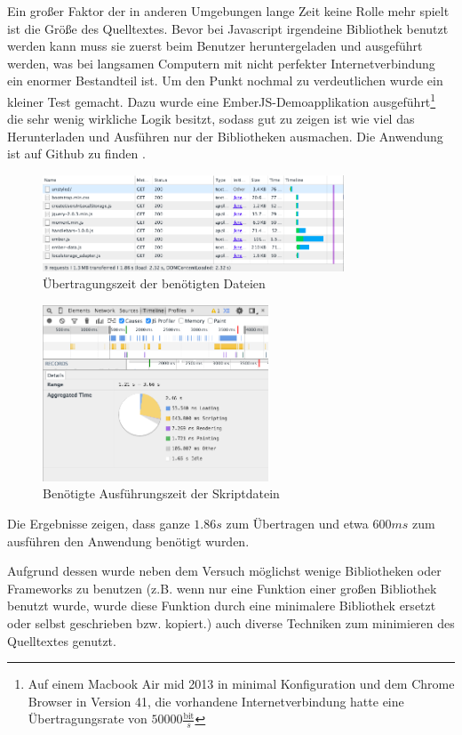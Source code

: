 \documentclass[12pt,twoside]{book}
\begin{document}
Ein großer Faktor der in anderen Umgebungen lange Zeit keine Rolle mehr spielt ist die Größe des Quelltextes. Bevor bei Javascript irgendeine Bibliothek benutzt werden kann muss sie zuerst beim Benutzer heruntergeladen und ausgeführt werden, was bei langsamen Computern mit nicht perfekter Internetverbindung ein enormer Bestandteil ist. Um den Punkt nochmal zu verdeutlichen wurde ein kleiner Test gemacht. Dazu wurde eine EmberJS-Demoapplikation ausgeführt\footnote{Auf einem Macbook Air mid 2013 in minimal Konfiguration und dem Chrome Browser in Version 41, die vorhandene Internetverbindung hatte eine Übertragungsrate von $50000 \frac{\text{bit}}{s}$} die sehr wenig wirkliche Logik besitzt, sodass gut zu zeigen ist wie viel das Herunterladen und Ausführen nur der Bibliotheken ausmachen.
Die Anwendung ist auf Github zu finden \cite{embercrud}.
\begin{figure}[H]
    \centering
    \includegraphics[width=0.8\textwidth]{images/performance_1.png}
    \caption{Übertragungszeit der benötigten Dateien}
    \label{fig:loadtimes}
\end{figure}
\begin{figure}[H]
    \centering
    \includegraphics[width=0.6\textwidth]{images/performance_2.png}
    \caption{Benötigte Ausführungszeit der Skriptdatein}
    \label{fig:executiontime}
\end{figure}
Die Ergebnisse zeigen, dass ganze $1.86s$ zum Übertragen und etwa $600ms$ zum ausführen den Anwendung benötigt wurden.

Aufgrund dessen wurde neben dem Versuch möglichst wenige Bibliotheken oder Frameworks zu benutzen (z.B. wenn nur eine Funktion einer großen Bibliothek benutzt wurde, wurde diese Funktion durch eine minimalere Bibliothek ersetzt oder selbst geschrieben bzw. kopiert.) auch diverse Techniken zum minimieren des Quelltextes genutzt.
\end{document}
